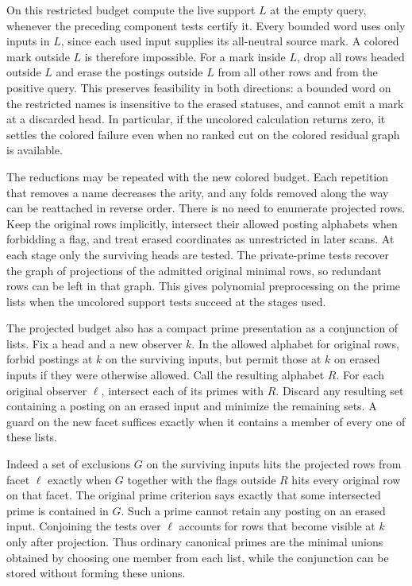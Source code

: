On this restricted budget compute the live support
$L$ at the empty query, whenever the preceding
component tests certify it. Every bounded word uses
only inputs in $L$, since each used input supplies
its all-neutral source mark. A colored mark outside
$L$ is therefore impossible. For a mark inside $L$,
drop all rows headed outside $L$ and erase the
postings outside $L$ from all other rows and from
the positive query. This preserves feasibility in
both directions: a bounded word on the restricted
names is insensitive to the erased statuses, and
cannot emit a mark at a discarded head. In
particular, if the uncolored calculation returns
zero, it settles the colored failure even when no
ranked cut on the colored residual graph is available.

The reductions may be repeated with the new colored
budget. Each repetition that removes a name decreases
the arity, and any folds removed along the way can
be reattached in reverse order. There is no need to
enumerate projected rows. Keep the original rows
implicitly, intersect their allowed posting alphabets
when forbidding a flag, and treat erased coordinates
as unrestricted in later scans. At each stage only
the surviving heads are tested. The private-prime
tests recover the graph of projections of the
admitted original minimal rows, so redundant rows
can be left in that graph. This gives polynomial
preprocessing on the prime lists when the uncolored
support tests succeed at the stages used.

The projected budget also has a compact prime
presentation as a conjunction of lists. Fix a head
and a new observer $k$. In the allowed alphabet
for original rows, forbid postings at $k$ on the
surviving inputs, but permit those at $k$ on erased
inputs if they were otherwise allowed. Call the
resulting alphabet $R$. For each original observer
$\ell$, intersect each of its primes with $R$.
Discard any resulting set containing a posting on
an erased input and minimize the remaining sets.
A guard on the new facet suffices exactly when it
contains a member of every one of these lists.

Indeed a set of exclusions $G$ on the surviving
inputs hits the projected rows from facet $\ell$
exactly when $G$ together with the flags outside
$R$ hits every original row on that facet. The
original prime criterion says exactly that some
intersected prime is contained in $G$. Such a prime
cannot retain any posting on an erased input.
Conjoining the tests over $\ell$ accounts for rows
that become visible at $k$ only after projection.
Thus ordinary canonical primes are the minimal
unions obtained by choosing one member from each
list, while the conjunction can be stored without
forming these unions.

